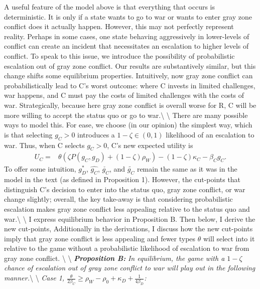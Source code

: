 \documentclass[
]{article}
\begin{document}
A useful feature of the model above is that everything that occurs is
deterministic. It is only if a state wants to go to war or wants to
enter gray zone conflict does it actually happen. However, this may not
perfectly represent reality. Perhaps in some cases, one state behaving
aggressively in lower-levels of conflict can create an incident that
necessitates an escalation to higher levels of conflict. To speak to
this issue, we introduce the possibility of probabilistic escalation out
of gray zone conflict. Our results are substantively similar, but this
change shifts some equilibrium properties. Intuitively, now gray zone
conflict can probabilistically lead to C's worst outcome: where C
invests in limited challenges, war happens, and C must pay the costs of
limited challenges with the costs of war. Strategically, because here
gray zone conflict is overall worse for R, C will be more willing to
accept the status quo or go to war.\textbackslash{} \textbackslash{}
There are many possible ways to model this. For ease, we choose (in our
opinion) the simplest way, which is that selecting \(g_{C}>0\)
introduces a \(1-\zeta\in(0,1)\) likelihood of an escalation to war.
Thus, when C selects \(g_{C}>0\), C's new expected utility is
\begin{align*}
U_{C}= & \theta\left(\zeta P(g_{C},g_{D})+(1-\zeta)\rho_{W}\right)-(1-\zeta)\kappa_{C}-\beta_{C}g_{C}.
\end{align*} To offer some intuition, \(g_{D}^{*}\), \(\hat{g_{C}}\),
\(\check{g_{C}}\), and \(\tilde{g_{C}}\) remain the same as it was in
the model in the text (as defined in Proposition 1). However, the
cut-points that distinguish C's decision to enter into the status quo,
gray zone conflict, or war change slightly; overall, the key take-away
is that considering probabilistic escalation makes gray zone conflict
less appealing relative to the status quo and war.\textbackslash{}
\textbackslash{} I express equilibrium behavior in Proposition B. Then
below, I derive the new cut-points, Additionally in the derivations, I
discuss how the new cut-points imply that gray zone conflict is less
appealing and fewer types \(\theta\) will select into it relative to the
game without a probabilistic likelihood of escalation to war from gray
zone conflict. \textbackslash{} \textbackslash{}
\textbf{\textit{Proposition B:}}\textit{ In equilibrium, the game with a $1-\zeta$ chance of escalation out of gray zone conflict to war will play out in the following manner.}\textbackslash{}
\textbackslash{}
\textit{Case 1, $\frac{\theta}{2\beta_{C}}\geq\rho_{W}-\rho_{0}+\kappa_{D}+\frac{1}{4\beta_{D}}$:}
\end{document}
